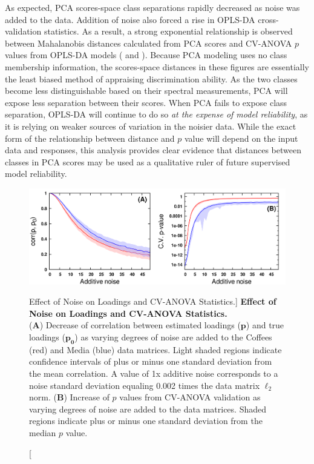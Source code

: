 \begin{doublespace}
As expected, PCA scores-space class separations rapidly decreased as noise
was added to the data. Addition of noise also forced a rise in OPLS-DA
cross-validation statistics. As a result, a strong exponential relationship
is observed between Mahalanobis distances calculated from PCA scores and
CV-ANOVA $p$ values from OPLS-DA models ( and
). Because PCA modeling uses no class membership
information, the scores-space distances in these figures are essentially the
least biased method of appraising discrimination ability. As the two classes
become less distinguishable based on their spectral measurements, PCA will
expose less separation between their scores. When PCA fails to expose class
separation, OPLS-DA will continue to do so
\emph{at the expense of model reliability}, as it is relying on weaker
sources of variation in the noisier data. While the exact form of the
relationship between distance and $p$ value will depend on the input data and
responses, this analysis provides clear evidence that distances between classes
in PCA scores may be used as a qualitative ruler of future supervised model
reliability.
\end{doublespace}

\begin{figure}[ht!]
\includegraphics[width=6in]{figs/apps/17-lines.png}
\caption
      [Effect of Noise on Loadings and CV-ANOVA Statistics.]{
  {\bf Effect of Noise on Loadings and CV-ANOVA Statistics.}
  \\
  ({\bf A}) Decrease of correlation between estimated loadings ($\mathbf{p}$)
  and true loadings ($\mathbf{p_0}$) as varying degrees of noise are added to
  the Coffees (red) and Media (blue) data matrices. Light shaded regions
  indicate confidence intervals of plus or minus one standard deviation from
  the mean correlation. A value of 1x additive noise corresponds to a noise
  standard deviation equaling 0.002 times the data matrix $\ell_2$ norm.
  ({\bf B}) Increase of $p$ values from CV-ANOVA validation as varying degrees
  of noise are added to the data matrices. Shaded regions indicate plus or
  minus one standard deviation from the median $p$ value.
}
\label{figure.4.17}
\end{figure}


